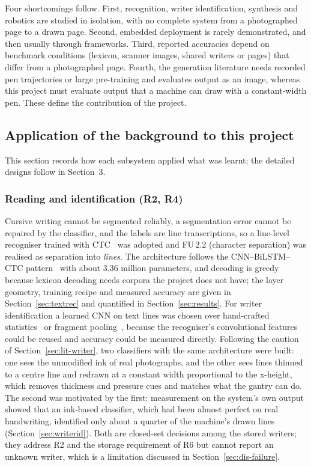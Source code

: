 Four shortcomings follow. First, recognition, writer identification, synthesis and robotics are studied in isolation, with no complete system from a photographed page to a drawn page. Second, embedded deployment is rarely demonstrated, and then usually through frameworks. Third, reported accuracies depend on benchmark conditions (lexicon, scanner images, shared writers or pages) that differ from a photographed page. Fourth, the generation literature needs recorded pen trajectories or large pre-training and evaluates output as an image, whereas this project must evaluate output that a machine can draw with a constant-width pen. These define the contribution of the project.

\subsection{Application of the background to this project}
\label{sec:lit-application}

This section records how each subsystem applied what was learnt; the detailed designs follow in Section~3.

\subsubsection{Reading and identification (R2, R4)}

Cursive writing cannot be segmented reliably, a segmentation error cannot be repaired by the classifier, and the labels are line transcriptions, so a line-level recogniser trained with CTC~\cite{graves2006} was adopted and FU\,2.2 (character separation) was realised as separation into \emph{lines}.
The architecture follows the CNN--BiLSTM--CTC pattern~\cite{shi2017,puigcerver2017,kizilirmak2023} with about 3.36 million parameters, and decoding is greedy because lexicon decoding needs corpora the project does not have; the layer geometry, training recipe and measured accuracy are given in Section~\ref{sec:textrec} and quantified in Section~\ref{sec:results}.
For writer identification a learned CNN on text lines was chosen over hand-crafted statistics~\cite{bulacu2007} or fragment pooling~\cite{he2020}, because the recogniser's convolutional features could be reused and accuracy could be measured directly.
Following the caution of Section~\ref{sec:lit-writer}, two classifiers with the same architecture were built: one sees the unmodified ink of real photographs, and the other sees lines thinned to a centre line and redrawn at a constant width proportional to the x-height, which removes thickness and pressure cues and matches what the gantry can do.
The second was motivated by the first: measurement on the system's own output showed that an ink-based classifier, which had been almost perfect on real handwriting, identified only about a quarter of the machine's drawn lines (Section~\ref{sec:writerid}).
Both are closed-set decisions among the stored writers; they address R2 and the storage requirement of R6 but cannot report an unknown writer, which is a limitation discussed in Section~\ref{sec:dis-failure}.

